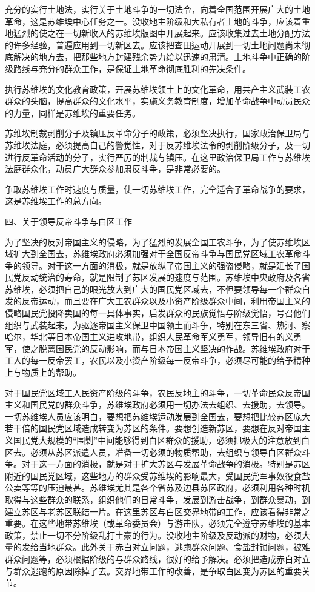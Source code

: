 充分的实行土地法，实行关于土地斗争的一切法令，向着全国范围开展广大的土地革命，这是苏维埃中心任务之一。没收地主阶级和大私有者土地的斗争，应该着重地猛烈的使之在一切新收入的苏维埃版图中开展起来。应该收集过去土地分配方法的许多经验，普遍应用到一切新区去。应该把查田运动开展到一切土地问题尚未彻底解决的地方去，把那些地方封建残余势力给以迅速的肃清。土地斗争中正确的阶级路线与充分的群众工作，是保证土地革命彻底胜利的先决条件。

执行苏维埃的文化教育政策，开展苏维埃领土上的文化革命，用共产主义武装工农群众的头脑，提高群众的文化水平，实施义务教育制度，增加革命战争中动员民众的力量，同样是苏维埃的重要任务。

苏维埃制裁剥削分子及镇压反革命分子的政策，必须坚决执行，国家政治保卫局与苏维埃法庭，必须提高自己的警觉性，对于反苏维埃法令的剥削阶级分子，及一切进行反革命活动的分子，实行严厉的制裁与镇压。在这里政治保卫局工作与苏维埃法庭群众化，动员广大群众参加肃反斗争，是非常必要的。

争取苏维埃工作时速度与质量，使一切苏维埃工作，完全适合子革命战争的要求，这是苏维埃工作的总方向。

四、关于领导反帝斗争与白区工作

为了坚决的反对帝国主义的侵略，为了猛烈的发展全国工农斗争，为了使苏维埃区域扩大到全国去，苏维埃政府必须加强对于全国反帝斗争与国民党区域工农革命斗争的领导。对于这一方面的消极，就是放纵了帝国主义的强盗侵略，就是延长了国民党反动统治的寿命，就是限制了苏区发展的速度与范围。苏维埃中央政府及各省苏维埃，必须把自己的眼光放大到广大的国民党区域去，不但要领导每一个群众自发的反帝运动，而且要在广大工农群众以及小资产阶级群众中间，利用帝国主义的侵略国民党投降卖国的每一具体事实，启发群众的民族觉悟与阶级觉悟，号召他们组织与武装起来，为驱逐帝国主义保卫中国领土而斗争，特别在东三省、热河、察哈尔，华北等日本帝国主义进攻地带，组织人民革命军义勇军，领导旧有的义勇军，使之脱离国民党的反动影响，而与日本帝国主义坚决的作战。苏维埃政府对于工人的每一反帝罢工，农民以及小资产阶级每一反帝斗争，必须尽可能的给予精种上与物质上的帮助。

对于国民党区域工人民资产阶级的斗争，农民反地主的斗争，一切革命民众反帝国主义和国民党的群众斗争，苏维埃政府必须用一切办法去组织、去援助，去领导。一切苏维埃人员应该明白，要想把苏维埃运动发展到全国去，要想把比较苏区庞大若干倍的国民党区域造成转变为苏区的条件。要想创造新苏区，要想在反对帝国主义国民党大规模的“围剿”中间能够得到白区群众的援助，必须把极大的注意放到白区去。必须从苏区派遣人员，准备一切必须的物质帮助，去组织与领导白区群众斗争。对于这一方面的消极，就是对于扩大苏区与发展革命战争的消极。特别是苏区附近的国民党区域，这些地方的群众受苏维埃的影响最大，受国民党军事奴役食盐公卖等等的压迫最甚。苏维埃尤其是各个省苏及边县苏区政府，必须利用各种时机取得与这些群众的联系，组织他们的日常斗争，发展到游击战争，到群众暴动，到建立苏区与老苏区联结一片。在这里苏区与白区交界地带的工作，应该看得非常之重要。在这些地带苏维埃（或革命委员会）与游击队，必须完全遵守苏维埃的基本政策，禁止一切不分阶级乱打土豪的行为。没收地主阶级及反动派的财物，必须大量的发给当地群众。此外关于赤白对立问题，逃跑群众问题、食盐封锁问题，被难群众问题等，必须根据阶级的与群众路线，很好的给予解决。必须把造成赤白对立与群众逃跑的原因除掉了去。交界地带工作的改善，是争取白区变为苏区的重要关节。


